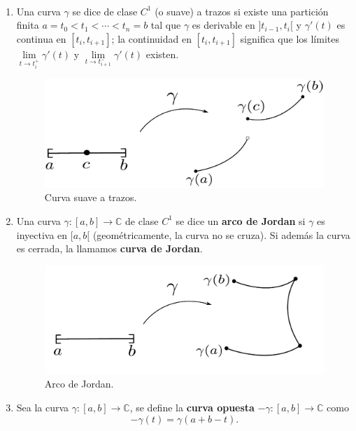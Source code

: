 \begin{defi}
\ 

\begin{enumerate}
\item Una curva $\gamma$ se dice de clase $C^1$ (o suave) a trazos si existe una partición finita $a = t_0 < t_1 < \cdots < t_n = b$ tal que $\gamma$ es derivable en $]t_{i-1},t_i[$ y $\gamma'(t)$ es continua en $[t_i, t_{i+1}]$; la continuidad en $[t_i, t_{i+1}]$ significa que los límites $\lim\limits_{t \to t_i^+} \gamma'(t)$ y $\lim\limits_{t\to t_{i+1}^-} \gamma'(t)$ existen.

\begin{figure}[H]
    \centering
    \includegraphics[scale = 0.5]{Figuras/Curva2.pdf}
    \caption{Curva suave a trazos.}
    \label{fig:Curva2}
\end{figure}

\item Una curva $\gamma : [a,b] \longrightarrow \mathbb{C}$ de clase $C^1$ se dice un \textbf{arco de Jordan} si $\gamma$ es inyectiva en $[a,b[$ (geométricamente, la curva no se cruza). Si además la curva es cerrada, la llamamos \textbf{curva de Jordan}.

\begin{figure}[H]
    \centering
    \includegraphics[scale = 0.5]{Figuras/Curva3.pdf}
    \caption{Arco de Jordan.}
    \label{fig:Curva3}
\end{figure}

\item Sea la curva $\gamma: [a,b] \longrightarrow \mathbb{C}$, se define la \textbf{curva opuesta} $- \gamma : [a,b] \longrightarrow \mathbb{C}$ como 
$$-\gamma(t) = \gamma(a+b-t).$$


\end{enumerate}
\end{defi}
